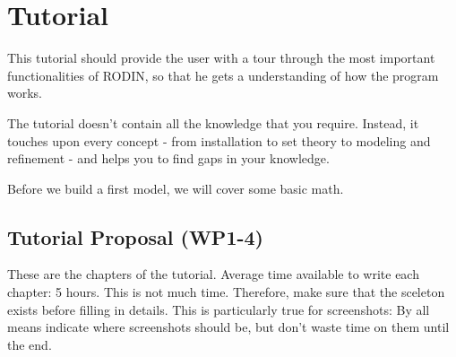 \chapter{Tutorial}
\label{tutorial}

This tutorial should provide the user with a tour through the most important functionalities of RODIN, so that he gets a understanding of how the program works.

The tutorial doesn't contain all the knowledge that you require.  Instead, it touches upon every concept - from installation to set theory to modeling and refinement - and helps you to find gaps in your knowledge.

Before we build a first model, we will cover some basic math.

\section{Tutorial Proposal (WP1-4)}

These are the chapters of the tutorial.  Average time available to write each chapter: 5 hours.  This is not much time.  Therefore, make sure that the sceleton exists before filling in details.  This is particularly true for screenshots: By all means indicate where screenshots should be, but don't waste time on them until the end.

